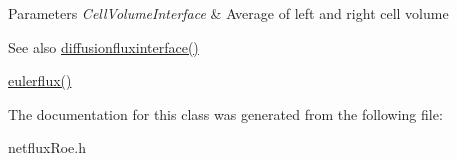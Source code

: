 \begin{DoxyParams}{Parameters}
{\em Cell\+Volume\+Interface} & Average of left and right cell volume\\
\hline
\end{DoxyParams}
\begin{DoxySeeAlso}{See also}
\hyperlink{classdiffusionfluxinterface}{diffusionfluxinterface()} 

\hyperlink{classeulerflux}{eulerflux()}
\end{DoxySeeAlso}


The documentation for this class was generated from the following file\+:\begin{DoxyCompactItemize}
\item 
netflux\+Roe.\+h\end{DoxyCompactItemize}
